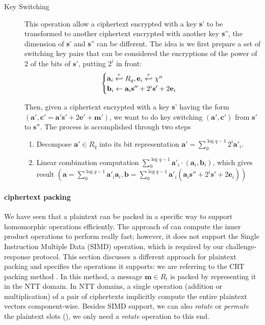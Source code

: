 \begin{description}
\item[Key Switching] This operation allow a ciphertext encrypted with a key
  \textbf{s}' to be transformed to another ciphertext encrypted with another key
  \textbf{s}'', the dimension of \textbf{s}' and \textbf{s}'' can be
  different. The idea is we first prepare a set of switching key pairs that can
  be considered the encryptions of the power of 2 of the bits of $\mathbf{s}'$,
  putting $2^{i}$ in front:
  \[
    \begin{cases}
      \mathbf{a}_{i} \stackrel{r}{\hookleftarrow} R_{q}, \mathbf{e}_{i} \stackrel{r}{\hookleftarrow} \chi^{n}\\
      \mathbf{b}_{i} \gets \mathbf{a}_{i}\mathbf{s}'' + 2^{i}\mathbf{s}' + 2\mathbf{e}_{i}
    \end{cases}
  \]

  Then, given a ciphertext encrypted with a key \textbf{s}' having the form
  $(\mathbf{a}', \mathbf{c}' = \mathbf{a}'\mathbf{s}' + 2\mathbf{e}' +
  \mathbf{m}')$, we want to do key switching $(\mathbf{a}',\mathbf{c}')$ from
  $\mathbf{s}'$ to $\mathbf{s}''$. The process is accomplished through two steps
  \begin{enumerate}
  \item Decompose $\mathbf{a}' \in R_{q}$ into its bit representation
    $\mathbf{a}' = \sum_{0}^{\log q - 1}2^{i}\mathbf{a}'_{i}$.
  \item Linear combination computation
    $\sum_{0}^{\log q - 1}\mathbf{a}'_{i} \cdot (\mathbf{a}_{i},
    \mathbf{b}_{i})$, which gives result
    $(\mathbf{a} = \sum_{0}^{\log q - 1}\mathbf{a}'_{i}\mathbf{a}_{i},
    \mathbf{b} = \sum_{0}^{\log q - 1}\mathbf{a}'_{i}(\mathbf{a}_{i}\mathbf{s}''
    + 2^{i}\mathbf{s}' + 2\mathbf{e}_{i}))$
  \end{enumerate}
\end{description}


\paragraph{ciphertext packing}
We have seen that a plaintext can be packed in a specific way to support
homomorphic operations efficiently. The approach of \cite{yasuda2014practical}
can compute the inner product operations to perform really fast; however, it
does not support the Single Instruction Multiple Data (SIMD) operation, which is
required by our challenge-response protocol. This section discusses a different
approach for plaintext packing and specifies the operations it supports: we are
referring to the CRT packing method \cite{smart2014fully}. In this method, a
message \(\mathbf{m} \in R_{t}\) is packed by representing it in the NTT
domain. In NTT domains, a single operation (addition or multiplication) of a
pair of ciphertexts implicitly compute the entire plaintext vectors
component-wise. Besides SIMD support, we can also \textit{rotate} or
\textit{permute} the plaintext slots (\cite{gentry2012fully}), we only need a
\textit{rotate} operation to this end.


